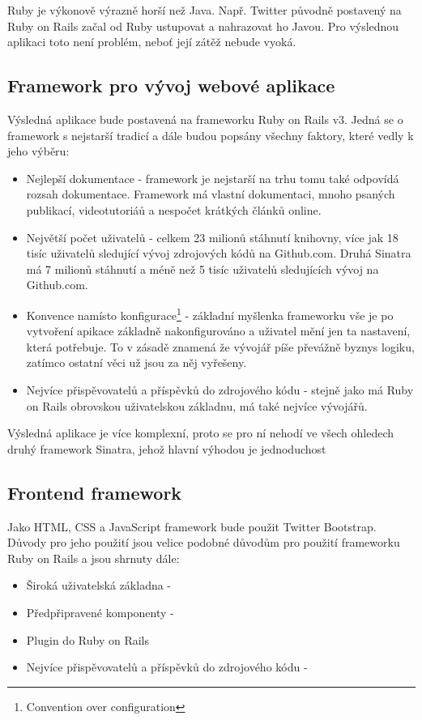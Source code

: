 Ruby je výkonově výrazně horší než Java\cite{website:java-ruby-performance}. Např. Twitter původně postavený na Ruby on Rails začal od Ruby ustupovat a nahrazovat ho Javou\cite{website:twitter-ruby-java}. Pro výslednou aplikaci toto není problém, neboť její zátěž nebude vyoká.

\subsection{Framework pro vývoj webové aplikace}
Výsledná aplikace bude postavená na frameworku Ruby on Rails v3. Jedná se o framework s nejstarší tradicí a dále budou popsány všechny faktory, které vedly k jeho výběru:

\begin{itemize}
\item Nejlepší dokumentace - framework je nejstarší na trhu tomu také odpovídá rozsah dokumentace. Framework má vlastní dokumentaci, mnoho psaných publikací, videotutoriáů a nespočet krátkých článků online\cite{website:ruby-toolbox-web}\cite{website:ruby-rails-documentation}.
\item Největší počet uživatelů - celkem 23 milionů stáhnutí knihovny, více jak 18 tisíc uživatelů sledující vývoj zdrojových kódů na Github.com. Druhá Sinatra má 7 milionů stáhnutí a méně než 5 tisíc uživatelů sledujících vývoj na Github.com\cite{website:ruby-toolbox-web}.
\item Konvence namísto konfigurace\footnote{Convention over configuration} - základní myšlenka frameworku vše je po vytvoření apikace základně nakonfigurováno a uživatel mění jen ta nastavení, která potřebuje. To v zásadě znamená že vývojář píše převážně byznys logiku, zatímco ostatní věci už jsou za něj vyřešeny.
\item Nejvíce přispěvovatelů a příspěvků do zdrojového kódu - stejně jako má Ruby on Rails obrovskou uživatelskou základnu, má také nejvíce vývojářů\cite{website:ruby-toolbox-web}.
\end{itemize}

Výsledná aplikace je více komplexní, proto se pro ní nehodí ve všech ohledech druhý framework Sinatra, jehož hlavní výhodou je jednoduchost \cite{harris2011sinatra}

\subsection{Frontend framework}
Jako HTML, CSS a JavaScript framework bude použit Twitter Bootstrap. Důvody pro jeho použití jsou velice podobné důvodům pro použití frameworku Ruby on Rails a jsou shrnuty dále:
\begin{itemize}
\item Široká uživatelská základna -
\item Předpřipravené komponenty - 
\item Plugin do Ruby on Rails
\item Nejvíce přispěvovatelů a příspěvků do zdrojového kódu - 
\end{itemize}
